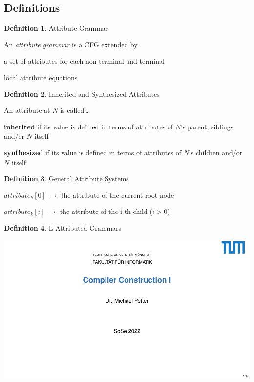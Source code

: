 \documentclass[10pt, landscape]{article}
\theoremstyle{definition}
\newtheorem{definition}{Definition}[section]
\begin{document}
\begin{multicols*}{3}
\subsection*{Definitions}

\begin{definition}{Attribute Grammar}

  An \textit{attribute grammar} is a CFG extended by
  \begin{compactitem}
    \item a set of attributes for each non-terminal and terminal
    \item local attribute equations
  \end{compactitem}
\end{definition}

\begin{definition}{Inherited and Synthesized Attributes}

  An attribute at $N$ is called\dots
  \begin{compactitem}
    \item \textbf{inherited} if its value is defined in terms of attributes of $N$'s parent, siblings and/or $N$ itself
    \item \textbf{synthesized} if its value is defined in terms of attributes of $N$'s children and/or $N$ itself
  \end{compactitem}
\end{definition}

\begin{definition}{General Attribute Systems}
  \begin{compactitem}
    \item {\color{red} $attribute_{k}[0]$} $\rightarrow$ the attribute of the current root node
    \item {\color{red} $attribute_{k}[i]$} $\rightarrow$ the attribute of the i-th child ($i > 0$)
  \end{compactitem}
\end{definition}

\begin{definition}{L-Attributed Grammars}

\includegraphics[page=205, width=\columnwidth, trim= 2.3cm 5.8cm 3cm .85cm, clip]{./selfservice-handout.pdf}


\end{definition}
\end{multicols*}
\end{document}
